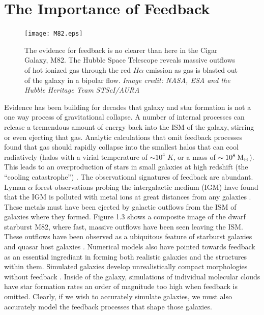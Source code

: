 \section{The Importance of Feedback}\label{intro:fb}
\begin{figure}
    \texttt{[image: M82.eps]}
	\caption[Massive outflows in M82]{The evidence for feedback is no clearer
	than here in the Cigar Galaxy, M82.  The Hubble Space Telescope reveals massive
	outflows of hot ionized gas through the red $H\alpha$ emission as gas is
	blasted out of the galaxy in a bipolar flow. \textit{Image credit: NASA, ESA
	and the Hubble Heritage Team STScI/AURA}}
\end{figure}
Evidence has been building for decades that galaxy and star formation is not a
one way process of gravitational collapse.  A number of internal processes can
release a tremendous amount of energy back into the ISM of the galaxy, stirring
or even ejecting that gas.  Analytic calculations that omit feedback processes
found that gas should rapidly collapse into the smallest halos that can cool
radiatively (halos with a virial temperature of $\sim 10^4\;K$, or a mass of
$\sim10^8\>{\rm M_{\odot}}$).  This leads to an overproduction of stars in small galaxies at
high redshift (the ``cooling catastrophe'') \citep{Cole2001,Benson2003}.  The
observational signatures of feedback are abundant.  Lyman $\alpha$ forest
observations probing the intergalactic medium (IGM) have found that the IGM is
polluted with metal ions at great distances from any galaxies
\citep{Sargent1988,Songaila1996,Dave1998}.  These metals must have been ejected
by galactic outflows from the ISM of galaxies where they formed. Figure 1.3
shows a composite image of the dwarf starburst M82, where fast, massive outflows
have been seen leaving the ISM.  These outflows have been observed as a
ubiquitous feature of starburst galaxies and quasar host galaxies
\citep{Veilleux2005,Werk2014}.  Numerical models also have pointed towards
feedback as an essential ingrediant in forming both realistic galaxies and the
structures within them. Simulated galaxies develop unrealistically compact
morphologies without feedback \citep{Stinson2006}.  Inside of the galaxy,
simulations of individual molecular clouds have star formation rates an order of
magnitude too high \citep{Agertz2013} when feedback is omitted.  Clearly,
if we wish to accurately simulate galaxies, we must also accurately model the
feedback processes that shape those galaxies.

